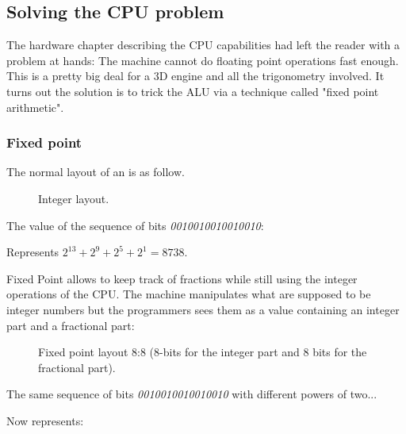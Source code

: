 \subsection{Solving the CPU problem}

The hardware chapter describing the CPU capabilities had left the reader with a problem at hands: The machine cannot do floating point operations fast enough. This is a pretty big deal for a 3D engine and all the trigonometry involved. It turns out the solution is to trick the ALU via a technique called "fixed point arithmetic".







\subsubsection{Fixed point}
The normal layout of an  is as follow.
\begin{figure}[H]
\centering
 
 \caption{Integer layout.} \label{fig:int_layout}
 \end{figure}
The value of the sequence of bits \emph{0010010010010010}:
\begin{figure}[H]
\centering

 \end{figure}

Represents $ 2^{13} + 2^9 + 2^5 + 2^1 =  8738 $.\\
 \par

Fixed Point allows to keep track of fractions while still using the integer operations of the CPU. The machine manipulates what are supposed to be integer numbers but the programmers sees them as a value containing an integer part and a fractional part:\\
\par
\begin{figure}[H]
 \centering
  
 \caption{Fixed point layout 8:8 (8-bits for the integer part and 8 bits for the fractional part).} \label{fig:mips}
\end{figure}

The same sequence of bits \emph{0010010010010010} with different powers of two...
\begin{figure}[H]
 \centering
   
\end{figure} 

Now represents:\\

